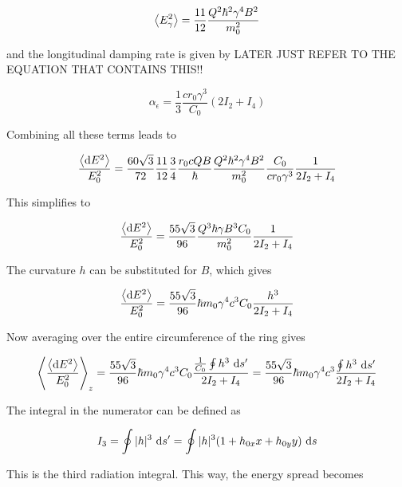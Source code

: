 \begin{equation}
    \left\langle {E_\gamma^2} \right\rangle = \frac{11}{12} \frac{Q^2\hbar^2 \gamma^4 B^2}{m_0^2}
\end{equation}

and the longitudinal damping rate is given by {\color{red} LATER JUST REFER TO THE EQUATION THAT CONTAINS THIS!!}

\begin{equation}
    \alpha_\epsilon = \frac{1}{3} \frac{c r_0 \gamma^3}{C_0} \left( 2I_2 + I_4 \right)
\end{equation}

Combining all these terms leads to

\begin{equation}
    \frac{\left\langle {\text{d}E^2} \right\rangle}{E_0^2} = \frac{60 \sqrt{3}}{72} \frac{11}{12} \frac{3}{4} \frac{r_0 c Q B}{\hbar} \frac{Q^2\hbar^2 \gamma^4 B^2}{m_0^2} \frac{C_0}{c r_0 \gamma^3} \frac{1}{2I_2 + I_4}
\end{equation}

This simplifies to

\begin{equation}
    \frac{\left\langle {\text{d}E^2} \right\rangle}{E_0^2} = \frac{55 \sqrt{3}}{96} \frac{Q^3 \hbar \gamma B^3 C_0}{m_0^2} \frac{1}{2I_2 + I_4}
\end{equation}

The curvature $h$ can be substituted for $B$, which gives

\begin{equation}
    \frac{\left\langle {\text{d}E^2} \right\rangle}{E_0^2} = \frac{55 \sqrt{3}}{96} \hbar m_0 \gamma^4 c^3 C_0 \frac{h^3}{2I_2 + I_4}
    \label{eq:meanenergydeviation}
\end{equation}

Now averaging over the entire circumference of the ring gives

\begin{equation}
    \left\langle {\frac{\left\langle {\text{d}E^2} \right\rangle}{E_0^2}} \right\rangle_z = \frac{55 \sqrt{3}}{96} \hbar m_0 \gamma^4 c^3 C_0 \frac{\frac{1}{C_0}\oint h^3 \ \text{d} s'}{2I_2 + I_4} = \frac{55 \sqrt{3}}{96} \hbar m_0 \gamma^4 c^3 \frac{\oint h^3 \ \text{d} s'}{2I_2 + I_4}
\end{equation}

The integral in the numerator can be defined as

\begin{equation}
    I_3 = \oint |h|^3 \ \text{d} s' = \oint |h|^3 (1 + h_{0x} x + h_{0y}y) \ \text{d} s
\end{equation}

This is the third radiation integral. This way, the energy spread becomes


